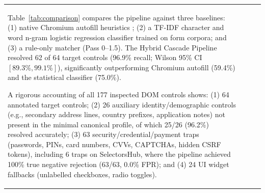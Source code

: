 \documentclass[runningheads,a4paper]{llncs}
\begin{document}
\begin{table}[t]
\begin{tabular}{p{2.0cm}p{2.8cm}p{1.4cm}p{5.1cm}}
Table~\ref{tab:comparison} compares the pipeline against three baselines: (1) native Chromium autofill heuristics \cite{chromium2024}; (2) a TF-IDF character and word n-gram logistic regression classifier trained on form corpora; and (3) a rule-only matcher (Pass 0--1.5). The Hybrid Cascade Pipeline resolved 62 of 64 target controls (96.9\% recall; Wilson 95\% CI $[89.3\%, 99.1\%]$), significantly outperforming Chromium autofill (59.4\%) and the statistical classifier (75.0\%).

A rigorous accounting of all 177 inspected DOM controls shows: (1) 64 annotated target controls; (2) 26 auxiliary identity/demographic controls (e.g., secondary address lines, country prefixes, application notes) not present in the minimal canonical profile, of which 25/26 (96.2\%) resolved accurately; (3) 63 security/credential/payment traps (passwords, PINs, card numbers, CVVs, CAPTCHAs, hidden CSRF tokens), including 6 traps on SelectorsHub, where the pipeline achieved 100\% true negative rejection (63/63, 0.0\% FPR); and (4) 24 UI widget fallbacks (unlabelled checkboxes, radio toggles).


\end{tabular}
\end{table}
\end{document}
